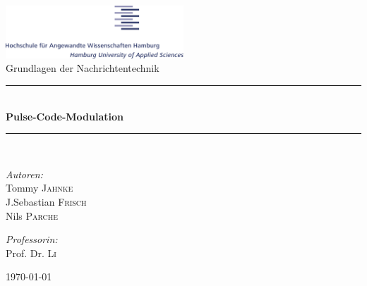 \documentclass[12pt, a4paper]{article}
\begin{document}
	
	\begin{titlepage}
		
		\begin{center}
			
			\includegraphics[width=0.5\textwidth]{HawLogo.png}
			\\[1.5cm]
			\LARGE Grundlagen der Nachrichtentechnik
			
			\newcommand{\HRule}{\rule{\linewidth}{0.5 mm}}
			\HRule \\[0.3cm]
			{\huge \bfseries Pulse-Code-Modulation} \\[0.3cm]
			\HRule \\[1.5cm]
			
			\begin{minipage}{0.4\textwidth}
				\begin{flushleft}
					\large \emph{Autoren:}\\
					Tommy \textsc{Jahnke}\\
					J.Sebastian \textsc{Frisch}\\
					Nils \textsc{Parche}
				\end{flushleft}
			\end{minipage}
			\hfill
			\begin{minipage}{0.4\textwidth}
				\begin{flushright}
					\large \emph{Professorin:}\\
					Prof. Dr. \textsc{Li}
					
				\end{flushright}
			\end{minipage}
			
			\vfill
			
			{\large \today}
		\end{center}
		
	\end{titlepage}
	
	\newpage
	\setcounter{page}{1}
	\listoffigures
	
\end{document}
